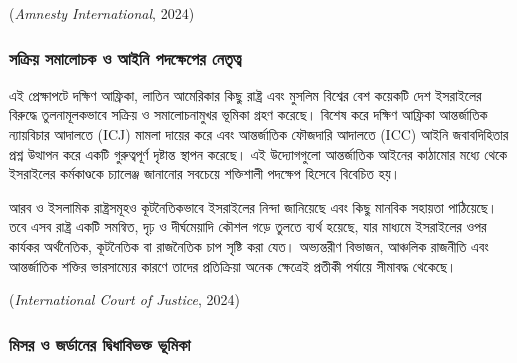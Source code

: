 (\emph{Amnesty International}, 2024)

\vspace{0.3em}

\subsubsection{সক্রিয় সমালোচক ও আইনি পদক্ষেপের
নেতৃত্ব}\label{ux9b8ux995ux9b0ux9df-ux9b8ux9aeux9b2ux99aux995-ux993-ux986ux987ux9a8-ux9aaux9a6ux995ux9b7ux9aaux9b0-ux9a8ux9a4ux9a4ux9ac}

এই প্রেক্ষাপটে দক্ষিণ আফ্রিকা, লাতিন আমেরিকার কিছু রাষ্ট্র এবং মুসলিম বিশ্বের বেশ
কয়েকটি দেশ ইসরাইলের বিরুদ্ধে তুলনামূলকভাবে সক্রিয় ও সমালোচনামুখর ভূমিকা গ্রহণ
করেছে। বিশেষ করে দক্ষিণ আফ্রিকা আন্তর্জাতিক ন্যায়বিচার আদালতে (ICJ) মামলা
দায়ের করে এবং আন্তর্জাতিক ফৌজদারি আদালতে (ICC) আইনি জবাবদিহিতার প্রশ্ন
উত্থাপন করে একটি গুরুত্বপূর্ণ দৃষ্টান্ত স্থাপন করেছে। এই উদ্যোগগুলো আন্তর্জাতিক আইনের
কাঠামোর মধ্যে থেকে ইসরাইলের কর্মকাণ্ডকে চ্যালেঞ্জ জানানোর সবচেয়ে শক্তিশালী
পদক্ষেপ হিসেবে বিবেচিত হয়।

আরব ও ইসলামিক রাষ্ট্রসমূহও কূটনৈতিকভাবে ইসরাইলের নিন্দা জানিয়েছে এবং কিছু
মানবিক সহায়তা পাঠিয়েছে। তবে এসব রাষ্ট্র একটি সমন্বিত, দৃঢ় ও দীর্ঘমেয়াদি কৌশল
গড়ে তুলতে ব্যর্থ হয়েছে, যার মাধ্যমে ইসরাইলের ওপর কার্যকর অর্থনৈতিক, কূটনৈতিক বা
রাজনৈতিক চাপ সৃষ্টি করা যেত। অভ্যন্তরীণ বিভাজন, আঞ্চলিক রাজনীতি এবং আন্তর্জাতিক
শক্তির ভারসাম্যের কারণে তাদের প্রতিক্রিয়া অনেক ক্ষেত্রেই প্রতীকী পর্যায়ে সীমাবদ্ধ
থেকেছে।

(\emph{International Court of Justice}, 2024)

\vspace{0.3em}

\subsubsection{মিসর ও জর্ডানের দ্বিধাবিভক্ত
ভূমিকা}\label{ux9aeux9b8ux9b0-ux993-ux99cux9b0ux9a1ux9a8ux9b0-ux9a6ux9acux9a7ux9acux9adux995ux9a4-ux9adux9aeux995}

